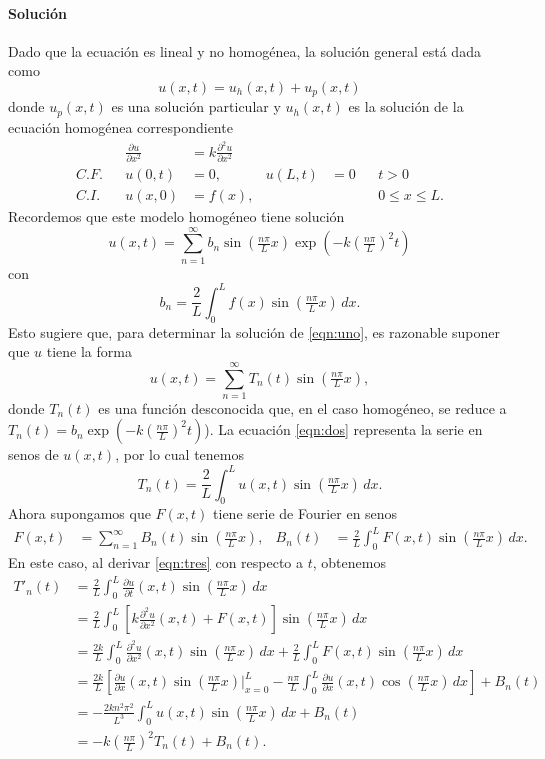 \documentclass[11pt,letterpaper,draft]{report}
\newcommand\<{\langle}
\renewcommand\>{\rangle}
\begin{document}
\paragraph{Solución}
Dado que la ecuación es lineal y no homogénea, la solución general
está dada como
\[
  u(x,t) = u_h(x,t)+u_p(x,t)
\]
donde $u_p(x,t)$ es una solución particular y
$u_h(x,t)$ es la solución de la ecuación homogénea correspondiente
\begin{align*}
  && \frac{\partial u}{\partial x^2}
  &=k \frac{\partial^2 u}{\partial x^2} \\
  C.F. && u(0,t) &= 0, & u(L,t)&= 0 && t>0 \\
  C.I. && u(x,0) &= f(x), &&&& 0\leq x\leq L.
\end{align*}
Recordemos que este modelo homogéneo tiene solución
\[
  u(x,t)
  =
  \sum_{n=1}^{\infty}b_n\sin(\tfrac{n\pi}{L}x)
  \exp(-k(\tfrac{n\pi}{L})^2t)
\]
con
\[
  b_n=\frac{2}{L}\int_{0}^{L}f(x)\sin(\tfrac{n\pi}{L}x)\,dx
.\]
Esto sugiere que, para determinar la solución de \eqref{eqn:uno},
es razonable suponer que $u$ tiene la forma
\begin{equation}\label{eqn:dos}
  u(x,t) = \sum_{n=1}^{\infty}T_n(t)\sin(\tfrac{n\pi}{L}x),
\end{equation}
donde $T_n(t)$ es una función desconocida que, en el caso homogéneo,
se reduce a $T_n(t)=b_n\exp(-k(\tfrac{n\pi}{L})^2t)$).
La ecuación \eqref{eqn:dos} representa la serie en senos de $u(x,t)$,
por lo cual tenemos
\begin{equation}\label{eqn:tres}
  T_n(t) = \frac{2}{L} \int_{0}^{L}u(x,t)\sin(\tfrac{n\pi}{L}x)\,dx.
\end{equation}
Ahora supongamos que $F(x,t)$ tiene serie de Fourier en senos
\begin{align*}
  F(x,t)
  &= \sum_{n=1}^{\infty}B_n(t)\sin(\tfrac{n\pi}{L}x),
  &B_n(t)
  &= \frac{2}{L}\int_{0}^{L}F(x,t)\sin(\tfrac{n\pi}{L}x)\,dx.
\end{align*}
En este caso, al derivar \eqref{eqn:tres} con respecto a $t$, obtenemos
\begin{align*}
  T'_n(t)
  &=
  \frac{2}{L}\int_{0}^{L}\frac{\partial u}{\partial t}(x,t)
  \sin(\tfrac{n\pi}{L}x)\,dx \\
  &=
  \frac{2}{L}\int_{0}^{L}
  \left[
  k \frac{\partial^2u}{\partial x^2}(x,t)+F(x,t)
          \right]
  \sin(\tfrac{n\pi}{L}x)\,dx \\
  &=
  \frac{2k}{L}\int_{0}^{L}
  \frac{\partial^2u}{\partial x^2}(x,t)
  \sin(\tfrac{n\pi}{L}x)\,dx
  +
  \frac{2}{L}\int_{0}^{L}
  F(x,t)
  \sin(\tfrac{n\pi}{L}x)\,dx \\
  &=
  \frac{2k}{L}\left[
    \frac{\partial u}{\partial x}(x,t)\sin(\tfrac{n\pi}{L}x)\Big|_{x=0}^L
    -
    \frac{n\pi}{L}\int_{0}^{L}\frac{\partial u}{\partial x}(x,t)
    \cos(\tfrac{n\pi}{L}x)\,dx
  \right]
  +B_n(t) \\
  &=
  -\frac{2kn^2\pi^2}{L^3}\int_{0}^{L}u(x,t)\sin(\tfrac{n\pi}{L}x)\,dx
  +B_n(t) \\
  &= -k(\tfrac{n\pi}{L})^2T_n(t)+B_n(t).
\end{align*}
\end{document}

